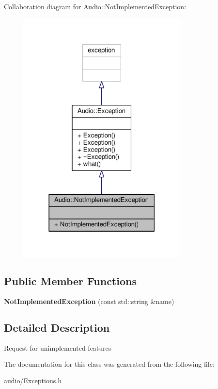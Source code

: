 Collaboration diagram for Audio\+:\+:Not\+Implemented\+Exception\+:
\nopagebreak
\begin{figure}[H]
\begin{center}
\leavevmode
\includegraphics[width=243pt]{d9/dcf/classAudio_1_1NotImplementedException__coll__graph}
\end{center}
\end{figure}
\subsection*{Public Member Functions}
\begin{DoxyCompactItemize}
\item 
{\bfseries Not\+Implemented\+Exception} (const std\+::string \&name)\hypertarget{classAudio_1_1NotImplementedException_a2e3f6d7ca058e055b2a76b8437e3ea43}{}\label{classAudio_1_1NotImplementedException_a2e3f6d7ca058e055b2a76b8437e3ea43}

\end{DoxyCompactItemize}


\subsection{Detailed Description}
Request for unimplemented features 

The documentation for this class was generated from the following file\+:\begin{DoxyCompactItemize}
\item 
audio/Exceptions.\+h\end{DoxyCompactItemize}

